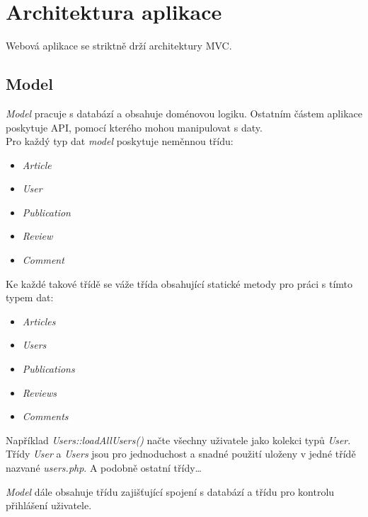 \documentclass[12pt, a4paper]{article}
\begin{document}
\pagebreak

\section{Architektura aplikace}
Webová aplikace se striktně drží architektury MVC.

\subsection{Model}
\emph{Model} pracuje s databází a obsahuje doménovou logiku. Ostatním částem aplikace poskytuje API, pomocí kterého mohou manipulovat s daty. \\

\noindent
Pro každý typ dat \emph{model} poskytuje neměnnou třídu:
\begin{itemize}
	\item \emph{Article}
	\item \emph{User}
	\item \emph{Publication}
	\item \emph{Review}
	\item \emph{Comment}
\end{itemize}

\pagebreak[2]

\noindent
Ke každé takové třídě se váže třída obsahující statické metody pro práci s tímto typem dat:
\begin{itemize}
	\item \emph{Articles}
	\item \emph{Users}
	\item \emph{Publications}
	\item \emph{Reviews}
	\item \emph{Comments}
\end{itemize}
Například \emph{Users::loadAllUsers()} načte všechny uživatele jako kolekci typů \emph{User}. Třídy \emph{User} a \emph{Users} jsou pro jednoduchost a snadné použití uloženy v jedné třídě nazvané \emph{users.php}. A podobně ostatní třídy\dots

\emph{Model} dále obsahuje třídu zajišťující spojení s databází a třídu pro kontrolu přihlášení uživatele.
\end{document}
